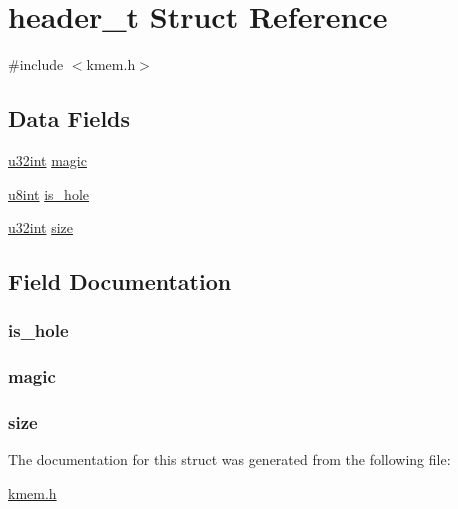 \hypertarget{structheader__t}{
\section{header\_\-t Struct Reference}
\label{structheader__t}
}


{\ttfamily \#include $<$kmem.h$>$}

\subsection*{Data Fields}
\begin{DoxyCompactItemize}
\item 
\hyperlink{library_8h_ad7ecf93b77285d9bf039d27fa3f1a588}{u32int} \hyperlink{structheader__t_a5a7b763a121d2c2573df337c8537a6a0}{magic}
\item 
\hyperlink{library_8h_a1026e682ffdadc1701c42cd44ce9efcf}{u8int} \hyperlink{structheader__t_a36d2573383faf36513f89b35327de3cc}{is\_\-hole}
\item 
\hyperlink{library_8h_ad7ecf93b77285d9bf039d27fa3f1a588}{u32int} \hyperlink{structheader__t_a8c5ccb4d457cb24df33a7c9facfa2650}{size}
\end{DoxyCompactItemize}


\subsection{Field Documentation}
\hypertarget{structheader__t_a36d2573383faf36513f89b35327de3cc}{
\subsubsection[{is\_\-hole}]{ {\bf is\_\-hole}}}
\label{structheader__t_a36d2573383faf36513f89b35327de3cc}
\hypertarget{structheader__t_a5a7b763a121d2c2573df337c8537a6a0}{
\subsubsection[{magic}]{ {\bf magic}}}
\label{structheader__t_a5a7b763a121d2c2573df337c8537a6a0}
\hypertarget{structheader__t_a8c5ccb4d457cb24df33a7c9facfa2650}{
\subsubsection[{size}]{ {\bf size}}}
\label{structheader__t_a8c5ccb4d457cb24df33a7c9facfa2650}


The documentation for this struct was generated from the following file:\begin{DoxyCompactItemize}
\item 
\hyperlink{kmem_8h}{kmem.h}\end{DoxyCompactItemize}
